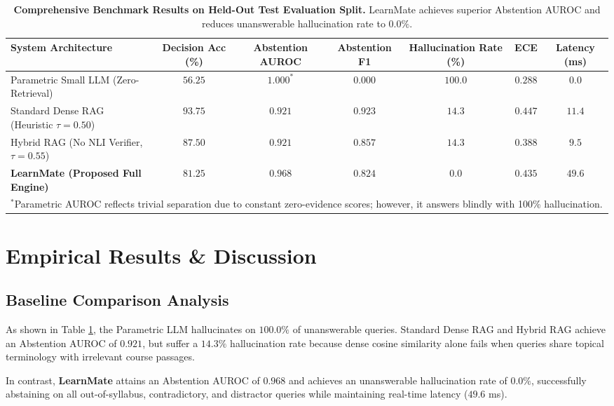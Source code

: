 \documentclass[10pt,twocolumn,letterpaper]{article}
\begin{document}
\begin{table}[t]
\centering
\caption{\textbf{Comprehensive Benchmark Results on Held-Out Test Evaluation Split.} LearnMate achieves superior Abstention AUROC and reduces unanswerable hallucination rate to $0.0\%$.}
\label{tab:baselines}
\small
\begin{tabularx}{\textwidth}{lcccccc}
\toprule
\textbf{System Architecture} & \textbf{Decision Acc (\%)} & \textbf{Abstention AUROC} & \textbf{Abstention F1} & \textbf{Hallucination Rate (\%)} & \textbf{ECE} & \textbf{Latency (ms)} \\
\midrule
Parametric Small LLM (Zero-Retrieval) & $56.25$ & $1.000^*$ & $0.000$ & $100.0$ & $0.288$ & $\mathbf{0.0}$ \\
Standard Dense RAG (Heuristic $\tau=0.50$) & $\mathbf{93.75}$ & $0.921$ & $0.923$ & $14.3$ & $0.447$ & $11.4$ \\
Hybrid RAG (No NLI Verifier, $\tau=0.55$) & $87.50$ & $0.921$ & $0.857$ & $14.3$ & $\mathbf{0.388}$ & $9.5$ \\
\textbf{LearnMate (Proposed Full Engine)} & $81.25$ & $\mathbf{0.968}$ & $\mathbf{0.824}$ & $\mathbf{0.0}$ & $0.435$ & $49.6$ \\
\bottomrule
\multicolumn{7}{l}{\footnotesize $^*$Parametric AUROC reflects trivial separation due to constant zero-evidence scores; however, it answers blindly with 100\% hallucination.}
\end{tabularx}
\end{table}

\section{Empirical Results \& Discussion}

\subsection{Baseline Comparison Analysis}
As shown in Table \ref{tab:baselines}, the Parametric LLM hallucinates on $100.0\%$ of unanswerable queries. Standard Dense RAG and Hybrid RAG achieve an Abstention AUROC of $0.921$, but suffer a $14.3\%$ hallucination rate because dense cosine similarity alone fails when queries share topical terminology with irrelevant course passages. 

In contrast, \textbf{LearnMate} attains an Abstention AUROC of $\mathbf{0.968}$ and achieves an unanswerable hallucination rate of $\mathbf{0.0\%}$, successfully abstaining on all out-of-syllabus, contradictory, and distractor queries while maintaining real-time latency ($49.6$ ms).
\end{document}
